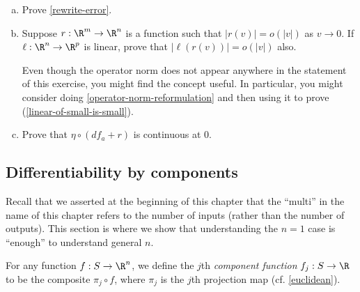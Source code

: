 \begin{exercise} \label{chain-rule-details}
	\begin{enumerate}[(a)]
		\item Prove \cref{rewrite-error}. 
		\item \label{linear-of-small-is-small} Suppose $r : \R^m \to \R^n$ is a function such that $|r(v)| = o(|v|)$ as $v \to 0$. If $\ell : \R^n \to \R^p$ is linear, prove that $|\ell(r(v))| = o(|v|)$ also.
		
		
		\begin{hint} Even though the operator norm does not appear anywhere in the statement of this exercise, you might find the concept useful. In particular, you might consider doing \cref{operator-norm-reformulation} and then using it to prove (\ref{linear-of-small-is-small}). 
		\end{hint}
		
		\item Prove that $\eta \circ (df_a + r)$ is continuous at 0. 
	\end{enumerate}
\end{exercise}

\subsection{Differentiability by components}

Recall that we asserted at the beginning of this chapter that the ``multi'' in the name of this chapter refers to the number of inputs (rather than the number of outputs). This section is where we show that understanding the $n = 1$ case is ``enough'' to understand general $n$.

\begin{definition}
	For any function $f : S \to \R^n$, we define the $j$th \emph{component function} $f_j : S \to \R$ to be the composite $\pi_j \circ f$, where $\pi_j$ is the $j$th projection map (cf. \cref{euclidean}).
\end{definition}

